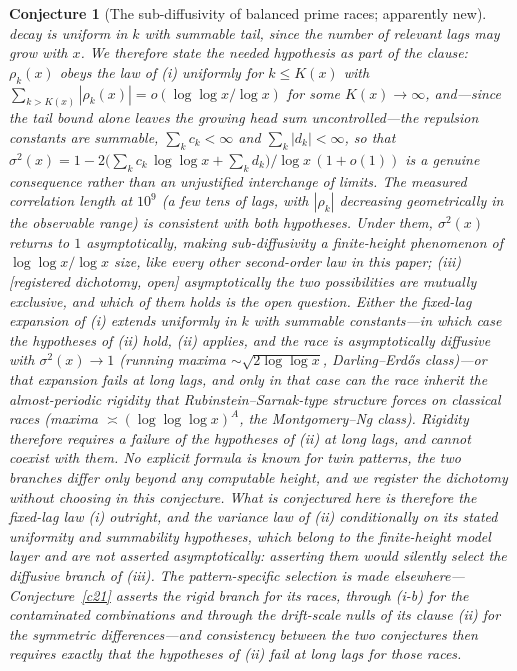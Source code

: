 \documentclass[11pt]{article}
\newtheorem{conjecture}{Conjecture}
\theoremstyle{definition}
\begin{document}
\begin{conjecture}[The sub-diffusivity of balanced prime races;
apparently new]
decay is \emph{uniform in $k$ with summable tail}, since the number
of relevant lags may grow with $x$.  We therefore state the needed
hypothesis as part of the clause: $\rho_k(x)$ obeys the law of (i)
uniformly for $k\le K(x)$ with
$\sum_{k>K(x)}|\rho_k(x)|=o(\log\log x/\log x)$ for some
$K(x)\to\infty$, \emph{and}---since the tail bound alone leaves the
growing head sum uncontrolled---the
repulsion constants are summable, $\sum_k c_k<\infty$ and
$\sum_k|d_k|<\infty$, so that
$\sigma^2(x)=1-2\bigl(\textstyle\sum_kc_k\,\log\log
x+\sum_kd_k\bigr)/\log x\,(1+o(1))$ is a genuine consequence
rather than an unjustified interchange of limits.  The measured
correlation length at $10^9$ (a few tens of lags, with
$|\rho_k|$ decreasing geometrically in the observable range) is
consistent with both hypotheses.  Under them,
$\sigma^2(x)$ returns to $1$
asymptotically, making sub-diffusivity a finite-height phenomenon
of $\log\log x/\log x$ size, like every other second-order law in
this paper;
\emph{(iii)} [registered dichotomy, open] asymptotically the two
possibilities are \emph{mutually exclusive}, and which of them holds
is the open question.  Either the fixed-lag expansion of (i) extends
uniformly in $k$ with summable constants---in which case the
hypotheses of (ii) hold, (ii) applies, and the race is asymptotically
diffusive with $\sigma^2(x)\to1$ (running maxima
$\sim\sqrt{2\log\log x}$, Darling--Erd\H os class)---or that
expansion fails at long lags, and only in that case can the race
inherit the almost-periodic rigidity that Rubinstein--Sarnak-type
structure \cite{RubinsteinSarnak} forces on classical races (maxima
$\asymp(\log\log\log x)^{A}$, the Montgomery--Ng class).  Rigidity
therefore requires a failure of the hypotheses of (ii) at long lags,
and cannot coexist with them.  No explicit
formula is known for twin patterns, the two branches differ only
beyond any computable height, and we register the dichotomy without
choosing \emph{in this conjecture}.  What is conjectured here is
therefore the fixed-lag law (i) outright, and the variance law of
(ii) \emph{conditionally on} its stated uniformity and summability
hypotheses, which belong to the finite-height model layer and are
not asserted asymptotically: asserting them would silently select
the diffusive branch of (iii).  The pattern-specific selection is made elsewhere---Conjecture~\ref{c21} asserts the rigid branch for its races, through (i-b) for the contaminated combinations and through the drift-scale nulls of its clause (ii) for the symmetric differences---and consistency between the two
conjectures then requires exactly that the hypotheses of (ii) fail
at long lags for those races.
\end{conjecture}
\end{document}
